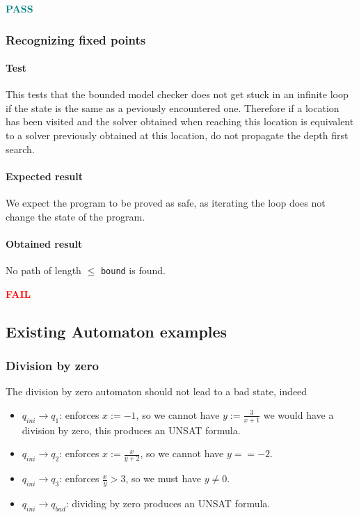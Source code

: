 \documentclass[letterpaper,12pt]{article}
\begin{document}
\textbf{\textcolor{teal}{PASS}}

\subsubsection{Recognizing fixed points}
\paragraph{Test}
This tests that the bounded model checker does not get stuck in an infinite loop if the state is the same as a peviously encountered one. Therefore if a location has been visited and the solver obtained when reaching this location is equivalent to a solver previously obtained at this location, do not propagate the depth first search.

\paragraph{Expected result}
We expect the program to be proved as safe, as iterating the loop does not change the state of the program.
\paragraph{Obtained result}
No path of length $\leq$ \texttt{bound} is found.
 
\textbf{\textcolor{red}{FAIL}}

\subsection{Existing Automaton examples}
\subsubsection{Division by zero}
The division by zero automaton should not lead to a bad state, indeed 
\begin{itemize}
\item $q_{ini} \rightarrow q_1 $: enforces $x:=-1$, so we cannot have $y:=\frac{3}{x+1}$ we would have a division by zero, this produces an UNSAT formula.
\item $q_{ini} \rightarrow q_2 $: enforces $x:=\frac{x}{y+2}$, so we cannot have $y==-2$.
\item $q_{ini} \rightarrow q_3 $: enforces $\frac{x}{y} > 3$, so we must have $y\neq 0$.
\item $q_{ini} \rightarrow q_{bad} $: dividing by zero produces an UNSAT formula.
\end{itemize}  
\end{document}
